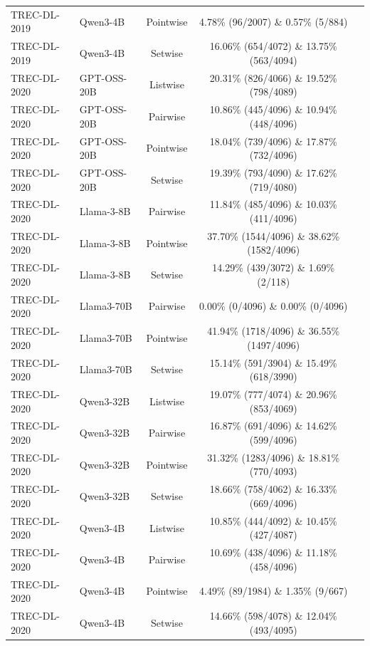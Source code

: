 \begin{table}[t]
\begin{tabular}{ll*{3}{c}}
TREC-DL-2019 & Qwen3-4B & Pointwise & 4.78\% (96/2007) \& 0.57\% (5/884) \\
TREC-DL-2019 & Qwen3-4B & Setwise & 16.06\% (654/4072) \& 13.75\% (563/4094) \\
TREC-DL-2020 & GPT-OSS-20B & Listwise & 20.31\% (826/4066) \& 19.52\% (798/4089) \\
TREC-DL-2020 & GPT-OSS-20B & Pairwise & 10.86\% (445/4096) \& 10.94\% (448/4096) \\
TREC-DL-2020 & GPT-OSS-20B & Pointwise & 18.04\% (739/4096) \& 17.87\% (732/4096) \\
TREC-DL-2020 & GPT-OSS-20B & Setwise & 19.39\% (793/4090) \& 17.62\% (719/4080) \\
TREC-DL-2020 & Llama-3-8B & Pairwise & 11.84\% (485/4096) \& 10.03\% (411/4096) \\
TREC-DL-2020 & Llama-3-8B & Pointwise & 37.70\% (1544/4096) \& 38.62\% (1582/4096) \\
TREC-DL-2020 & Llama-3-8B & Setwise & 14.29\% (439/3072) \& 1.69\% (2/118) \\
TREC-DL-2020 & Llama3-70B & Pairwise & 0.00\% (0/4096) \& 0.00\% (0/4096) \\
TREC-DL-2020 & Llama3-70B & Pointwise & 41.94\% (1718/4096) \& 36.55\% (1497/4096) \\
TREC-DL-2020 & Llama3-70B & Setwise & 15.14\% (591/3904) \& 15.49\% (618/3990) \\
TREC-DL-2020 & Qwen3-32B & Listwise & 19.07\% (777/4074) \& 20.96\% (853/4069) \\
TREC-DL-2020 & Qwen3-32B & Pairwise & 16.87\% (691/4096) \& 14.62\% (599/4096) \\
TREC-DL-2020 & Qwen3-32B & Pointwise & 31.32\% (1283/4096) \& 18.81\% (770/4093) \\
TREC-DL-2020 & Qwen3-32B & Setwise & 18.66\% (758/4062) \& 16.33\% (669/4096) \\
TREC-DL-2020 & Qwen3-4B & Listwise & 10.85\% (444/4092) \& 10.45\% (427/4087) \\
TREC-DL-2020 & Qwen3-4B & Pairwise & 10.69\% (438/4096) \& 11.18\% (458/4096) \\
TREC-DL-2020 & Qwen3-4B & Pointwise & 4.49\% (89/1984) \& 1.35\% (9/667) \\
TREC-DL-2020 & Qwen3-4B & Setwise & 14.66\% (598/4078) \& 12.04\% (493/4095) \\
\bottomrule
\end{tabular}
\end{table}
